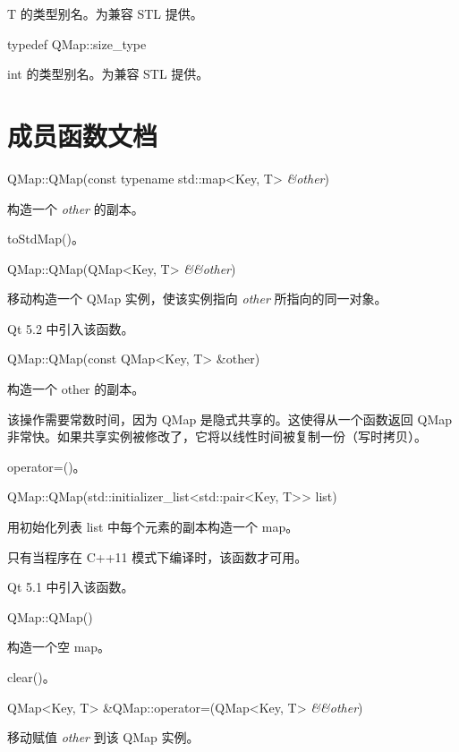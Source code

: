 T 的类型别名。为兼容 STL 提供。

\splitLine

typedef QMap::size\_type

int 的类型别名。为兼容 STL 提供。

\section{成员函数文档}

QMap::QMap(const typename std::map<Key, T> \emph{\&other})

构造一个 \emph{other} 的副本。

\begin{notice}[另请参阅]
toStdMap()。
\end{notice}

\splitLine

QMap::QMap(QMap<Key, T> \emph{\&\&other})

移动构造一个 QMap 实例，使该实例指向 \emph{other} 所指向的同一对象。

Qt 5.2 中引入该函数。

\splitLine

QMap::QMap(const QMap<Key, T> \&other)

构造一个 other 的副本。

该操作需要常数时间，因为 QMap 是隐式共享的。这使得从一个函数返回 QMap 非常快。如果共享实例被修改了，它将以线性时间被复制一份（写时拷贝）。

\begin{notice}[另请参阅]
operator=()。
\end{notice}

\splitLine

QMap::QMap(std::initializer\_list<std::pair<Key, T>> list)

用初始化列表 list 中每个元素的副本构造一个 map。

只有当程序在 C++11 模式下编译时，该函数才可用。

Qt 5.1 中引入该函数。

\splitLine

QMap::QMap()

构造一个空 map。
 
\begin{notice}[另请参阅]
clear()。
\end{notice}
	
\splitLine

QMap<Key, T> \&QMap::operator=(QMap<Key, T> \emph{\&\&other})

移动赋值 \emph{other} 到该 QMap 实例。

